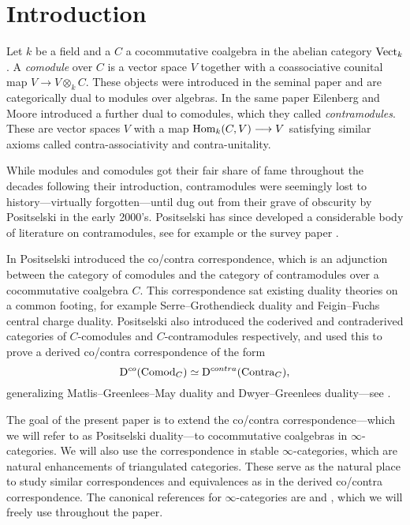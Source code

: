 
\section{Introduction}

Let $k$ be a field and a $C$ a cocommutative coalgebra in the abelian category $\mathrm{Vect}_k$. A \emph{comodule} over $C$ is a vector space $V$ together with a coassociative counital map $V\to V\otimes_k C$. These objects were introduced in the seminal paper \cite{eilenberg-moore_65} and are categorically dual to modules over algebras. In the same paper Eilenberg and Moore introduced a further dual to comodules, which they called \emph{contramodules}. These are vector spaces $V$ with a map $\operatorname{Hom}_k(C, V)\longrightarrow V$ satisfying similar axioms called contra-associativity and contra-unitality. 

While modules and comodules got their fair share of fame throughout the decades following their introduction, contramodules were seemingly lost to history---virtually forgotten---until dug out from their grave of obscurity by Positselski in the early 2000's. Positselski has since developed a considerable body of literature on contramodules, see for example \cite{positselski_2010, positselski_2011, positselski_2016, positselski_2017_contraadjusted, positselski_2020} or the survey paper \cite{positselski_2022_contramodules}. 

In \cite{positselski_2010} Positselski introduced the co/contra correspondence, which is an adjunction between the category of comodules and the category of contramodules over a cocommutative coalgebra $C$. This correspondence sat existing duality theories on a common footing, for example Serre--Grothendieck duality and Feigin--Fuchs central charge duality. Positselski also introduced the coderived and contraderived categories of $C$-comodules and $C$-contramodules respectively, and used this to prove a derived co/contra correspondence of the form 
\[\mathrm{D}^{co}(\mathrm{Comod}_C)\simeq \mathrm{D}^{contra}(\mathrm{Contra}_C),\]
generalizing Matlis--Greenlees--May duality and Dwyer--Greenlees duality---see \cite{positselski_2016}. 

The goal of the present paper is to extend the co/contra correspondence---which we will refer to as Positselski duality---to cocommutative coalgebras in $\infty$-categories. We will also use the correspondence in stable $\infty$-categories, which are natural enhancements of triangulated categories. These serve as the natural place to study similar correspondences and equivalences as in the derived co/contra correspondence. The canonical references for $\infty$-categories are \cite{lurie_09} and \cite{Lurie_HA}, which we will freely use throughout the paper. 




